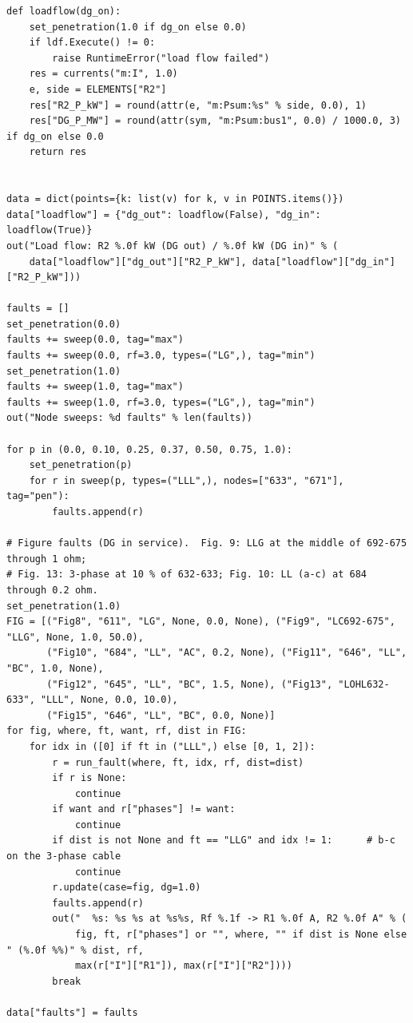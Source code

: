 \documentclass[12pt,a4paper]{article}
\begin{document}
\begin{lstlisting}
def loadflow(dg_on):
    set_penetration(1.0 if dg_on else 0.0)
    if ldf.Execute() != 0:
        raise RuntimeError("load flow failed")
    res = currents("m:I", 1.0)
    e, side = ELEMENTS["R2"]
    res["R2_P_kW"] = round(attr(e, "m:Psum:%s" % side, 0.0), 1)
    res["DG_P_MW"] = round(attr(sym, "m:Psum:bus1", 0.0) / 1000.0, 3) if dg_on else 0.0
    return res


data = dict(points={k: list(v) for k, v in POINTS.items()})
data["loadflow"] = {"dg_out": loadflow(False), "dg_in": loadflow(True)}
out("Load flow: R2 %.0f kW (DG out) / %.0f kW (DG in)" % (
    data["loadflow"]["dg_out"]["R2_P_kW"], data["loadflow"]["dg_in"]["R2_P_kW"]))

faults = []
set_penetration(0.0)
faults += sweep(0.0, tag="max")
faults += sweep(0.0, rf=3.0, types=("LG",), tag="min")
set_penetration(1.0)
faults += sweep(1.0, tag="max")
faults += sweep(1.0, rf=3.0, types=("LG",), tag="min")
out("Node sweeps: %d faults" % len(faults))

for p in (0.0, 0.10, 0.25, 0.37, 0.50, 0.75, 1.0):
    set_penetration(p)
    for r in sweep(p, types=("LLL",), nodes=["633", "671"], tag="pen"):
        faults.append(r)

# Figure faults (DG in service).  Fig. 9: LLG at the middle of 692-675 through 1 ohm;
# Fig. 13: 3-phase at 10 % of 632-633; Fig. 10: LL (a-c) at 684 through 0.2 ohm.
set_penetration(1.0)
FIG = [("Fig8", "611", "LG", None, 0.0, None), ("Fig9", "LC692-675", "LLG", None, 1.0, 50.0),
       ("Fig10", "684", "LL", "AC", 0.2, None), ("Fig11", "646", "LL", "BC", 1.0, None),
       ("Fig12", "645", "LL", "BC", 1.5, None), ("Fig13", "LOHL632-633", "LLL", None, 0.0, 10.0),
       ("Fig15", "646", "LL", "BC", 0.0, None)]
for fig, where, ft, want, rf, dist in FIG:
    for idx in ([0] if ft in ("LLL",) else [0, 1, 2]):
        r = run_fault(where, ft, idx, rf, dist=dist)
        if r is None:
            continue
        if want and r["phases"] != want:
            continue
        if dist is not None and ft == "LLG" and idx != 1:      # b-c on the 3-phase cable
            continue
        r.update(case=fig, dg=1.0)
        faults.append(r)
        out("  %s: %s %s at %s%s, Rf %.1f -> R1 %.0f A, R2 %.0f A" % (
            fig, ft, r["phases"] or "", where, "" if dist is None else " (%.0f %%)" % dist, rf,
            max(r["I"]["R1"]), max(r["I"]["R2"])))
        break

data["faults"] = faults


\end{lstlisting}
\end{document}
